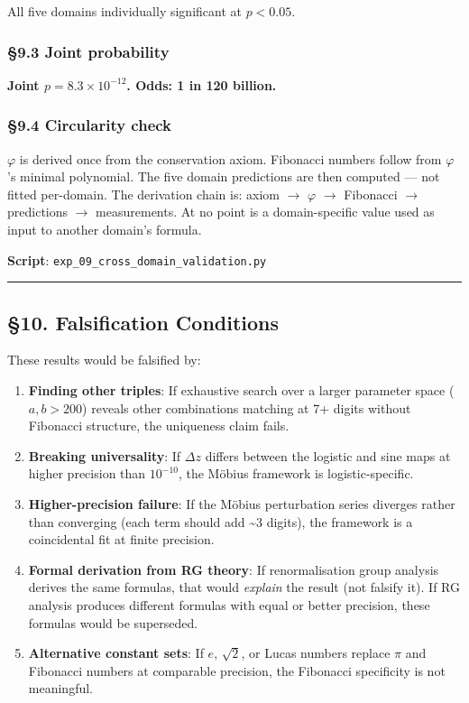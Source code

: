 \documentclass[
  11pt,
  a4paper]{article}
\providecommand{\tightlist}{%
  \setlength{\itemsep}{0pt}\setlength{\parskip}{0pt}}
\begin{document}
All five domains individually significant at \(p < 0.05\).

\subsubsection{§9.3 Joint probability}\label{joint-probability-1}

\textbf{Joint \(p = 8.3 \times 10^{-12}\). Odds: 1 in 120 billion.}

\subsubsection{§9.4 Circularity check}\label{circularity-check}

\(\varphi\) is derived once from the conservation axiom. Fibonacci
numbers follow from \(\varphi\)'s minimal polynomial. The five domain
predictions are then computed --- not fitted per-domain. The derivation
chain is: axiom \(\to\) \(\varphi\) \(\to\) Fibonacci \(\to\)
predictions \(\to\) measurements. At no point is a domain-specific value
used as input to another domain's formula.

\textbf{Script}: \texttt{exp\_09\_cross\_domain\_validation.py}

\begin{center}\rule{0.5\linewidth}{0.5pt}\end{center}

\subsection{§10. Falsification
Conditions}\label{falsification-conditions}

These results would be falsified by:

\begin{enumerate}
\def\labelenumi{\arabic{enumi}.}
\tightlist
\item
  \textbf{Finding other triples}: If exhaustive search over a larger
  parameter space (\(a, b > 200\)) reveals other combinations matching
  at 7+ digits without Fibonacci structure, the uniqueness claim fails.
\item
  \textbf{Breaking universality}: If \(\Delta z\) differs between the
  logistic and sine maps at higher precision than \(10^{-10}\), the
  Möbius framework is logistic-specific.
\item
  \textbf{Higher-precision failure}: If the Möbius perturbation series
  diverges rather than converging (each term should add \textasciitilde3
  digits), the framework is a coincidental fit at finite precision.
\item
  \textbf{Formal derivation from RG theory}: If renormalisation group
  analysis derives the same formulas, that would \emph{explain} the
  result (not falsify it). If RG analysis produces different formulas
  with equal or better precision, these formulas would be superseded.
\item
  \textbf{Alternative constant sets}: If \(e\), \(\sqrt{2}\), or Lucas
  numbers replace \(\pi\) and Fibonacci numbers at comparable precision,
  the Fibonacci specificity is not meaningful.
\end{enumerate}
\end{document}
